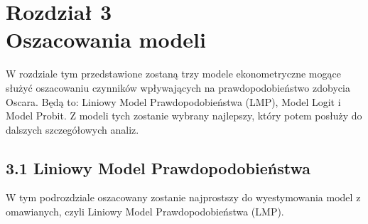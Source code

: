 \newpage
\chapter*{Rozdział 3 \\ \vspace{1cm} Oszacowania modeli}
 
W rozdziale tym przedstawione zostaną trzy modele ekonometryczne mogące służyć oszacowaniu czynników wpływających na prawdopodobieństwo zdobycia Oscara. Będą to: Liniowy Model Prawdopodobieństwa (LMP), Model Logit i Model Probit. Z modeli tych zostanie wybrany najlepszy, który potem posłuży do dalszych szczegółowych analiz.

\section*{3.1 Liniowy Model Prawdopodobieństwa}

W tym podrozdziale oszacowany zostanie najprostszy do wyestymowania model z omawianych, czyli Liniowy Model Prawdopodobieństwa (LMP).

\vspace{0.5cm}

